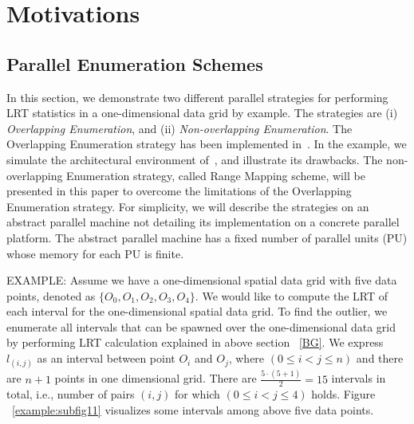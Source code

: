 \documentclass[AMA,LATO1COL]{WileyNJD-v2}
\begin{document}
\section{Motivations}
\label{sec:mov}

\subsection{Parallel Enumeration Schemes}
\label{sec:mov1}

In this section, we demonstrate two different parallel strategies for performing LRT statistics in a one-dimensional data grid by example. The strategies are (i) \emph{Overlapping Enumeration}, and (ii) \emph{Non-overlapping Enumeration}. The Overlapping Enumeration strategy has been implemented in~\cite{apweb}. In the example, we simulate the architectural environment of~\cite{apweb}, and illustrate its drawbacks. The non-overlapping Enumeration strategy, called Range Mapping scheme, will be presented in this paper to overcome the limitations of the Overlapping Enumeration strategy. For simplicity, we will describe the strategies on an abstract parallel machine not detailing its implementation on a concrete parallel platform.  The abstract parallel machine has a fixed number of parallel units (PU) whose memory for each PU is finite.

EXAMPLE: Assume we have a one-dimensional spatial data grid with  five data points, denoted as $\{O_0,O_1,O_2,O_3,O_4\}$. We would like to compute the LRT of each interval for the one-dimensional spatial data grid. To find the outlier, we enumerate all intervals that can be spawned over the one-dimensional data grid by performing LRT calculation explained in above section ~\ref{BG}. We express $l_{(i,j)}$ as an interval between point $O_i$ and $O_j$, where $ (0 \leq i <j \leq n)$ and there are $n+1$ points in one dimensional grid.  There are ${\frac{5 \cdot (5+1)}{2}}=15$ intervals in total, i.e., number of pairs $(i,j)$ for which $(0 \leq i < j \leq 4)$ holds. Figure ~\ref{example:subfig11} visualizes some intervals among above five data points.
\end{document}
